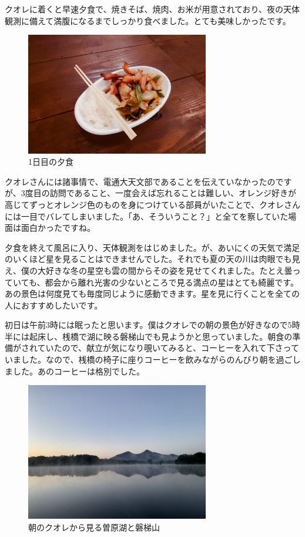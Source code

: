 \documentclass[../main]{subfiles}
\begin{document}
クオレに着くと早速夕食で、焼きそば、焼肉、お米が用意されており、夜の天体観測に備えて満腹になるまでしっかり食べました。とても美味しかったです。
\begin{figure}[H]
\includegraphics[width=8cm]{sections/Nakahara/IMG_8502.jpg}
\centering
\caption{1日目の夕食}
\end{figure}

クオレさんには諸事情で、電通大天文部であることを伝えていなかったのですが、3度目の訪問であること、一度会えば忘れることは難しい、オレンジ好きが高じてずっとオレンジ色のものを身につけている部員がいたことで、クオレさんには一目でバレてしまいました。「あ、そういうこと？」と全てを察していた場面は面白かったですね。

夕食を終えて風呂に入り、天体観測をはじめました。が、あいにくの天気で満足のいくほど星を見ることはできませんでした。それでも夏の天の川は肉眼でも見え、僕の大好きな冬の星空も雲の間からその姿を見せてくれました。たとえ曇っていても、都会から離れ光害の少ないところで見る満点の星はとても綺麗です。あの景色は何度見ても毎度同じように感動できます。星を見に行くことを全ての人におすすめしたいです。

初日は午前3時には眠ったと思います。僕はクオレでの朝の景色が好きなので5時半には起床し、桟橋で湖に映る磐梯山でも見ようかと思っていました。朝食の準備がされていたので、献立が気になり覗いてみると、コーヒーを入れて下さっていました。なので、桟橋の椅子に座りコーヒーを飲みながらのんびり朝を過ごしました。あのコーヒーは格別でした。

\begin{figure}[H]
\centering
\includegraphics[width=8cm]{sections/Nakahara/IMG_2643.jpeg}
\caption{朝のクオレから見る曽原湖と磐梯山}
\centering
\end{figure}
\end{document}
